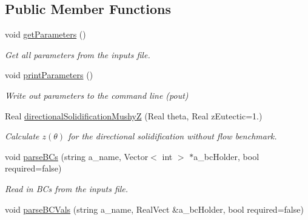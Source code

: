 \subsection*{Public Member Functions}
\begin{DoxyCompactItemize}
\item 
\hypertarget{class_mushy_layer_params_a2adf3cf11a6d85e97d1bd05d21e0fda0}{void \hyperlink{class_mushy_layer_params_a2adf3cf11a6d85e97d1bd05d21e0fda0}{get\-Parameters} ()}\label{class_mushy_layer_params_a2adf3cf11a6d85e97d1bd05d21e0fda0}

\begin{DoxyCompactList}\small\item\em Get all parameters from the inputs file. \end{DoxyCompactList}\item 
\hypertarget{class_mushy_layer_params_ab0c7b6204884af8093216788b3d1635f}{void \hyperlink{class_mushy_layer_params_ab0c7b6204884af8093216788b3d1635f}{print\-Parameters} ()}\label{class_mushy_layer_params_ab0c7b6204884af8093216788b3d1635f}

\begin{DoxyCompactList}\small\item\em Write out parameters to the command line (pout) \end{DoxyCompactList}\item 
\hypertarget{class_mushy_layer_params_a63bfa2c38942a3113a2cd99c694c003b}{Real \hyperlink{class_mushy_layer_params_a63bfa2c38942a3113a2cd99c694c003b}{directional\-Solidification\-Mushy\-Z} (Real theta, Real z\-Eutectic=1.)}\label{class_mushy_layer_params_a63bfa2c38942a3113a2cd99c694c003b}

\begin{DoxyCompactList}\small\item\em Calculate $ z(\theta) $ for the directional solidification without flow benchmark. \end{DoxyCompactList}\item 
\hypertarget{class_mushy_layer_params_a497dc7bd7c29819bd697d255af8de3d6}{void \hyperlink{class_mushy_layer_params_a497dc7bd7c29819bd697d255af8de3d6}{parse\-B\-Cs} (string a\-\_\-name, Vector$<$ int $>$ $\ast$a\-\_\-bc\-Holder, bool required=false)}\label{class_mushy_layer_params_a497dc7bd7c29819bd697d255af8de3d6}

\begin{DoxyCompactList}\small\item\em Read in B\-Cs from the inputs file. \end{DoxyCompactList}\item 
\hypertarget{class_mushy_layer_params_a534c1e576d710007d5bb7ad8354cd495}{void \hyperlink{class_mushy_layer_params_a534c1e576d710007d5bb7ad8354cd495}{parse\-B\-C\-Vals} (string a\-\_\-name, Real\-Vect \&a\-\_\-bc\-Holder, bool required=false)}\label{class_mushy_layer_params_a534c1e576d710007d5bb7ad8354cd495}


\end{DoxyCompactItemize}
